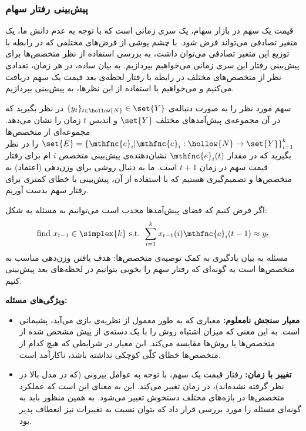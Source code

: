 \documentclass[a4paper,11px]{article}
\begin{document}
\subsubsection{
پیش‌بینی رفتار سهام
}


قیمت یک سهم در بازار سهام، یک سری زمانی است که با توجه به عدم دانش ما، یک متغیر تصادفی می‌تواند فرض شود. با چشم پوشی از فرض‌های مختلفی که در رابطه با توزیع این متغیر تصادفی می‌توان داشت، به بررسی استفاده از نظر متخصص‌ها برای پیش‌بینی رفتار این سری زمانی می‌خواهیم بپردازیم. به بیان ساده، در هر زمان، تعدادی نظر از متخصص‌های مختلف در رابطه با رفتار لحظه‌ی بعد قیمت یک سهم دریافت می‌کنیم و می‌خواهیم با استفاده از این نظرها، به پیش‌بینی بپردازیم.

سهم مورد نظر را به صورت دنباله‌ی
$\{ y_t \}_{t \in \hollow{N}} \in \set{Y}$
در نظر بگیرید که در آن مجموعه‌ی پیش‌آمدهای مختلف
$\set{Y}$
و اندیس
$t$
زمان را نشان می‌دهد. مجموعه‌ای از متخصص‌ها
$\set{E} = \left\lbrace \mthfnc{e}_i \vert \mthfnc{e}_i: \hollow{N} \rightarrow \set{Y} \right\rbrace^{k}_{i=1}$
را در نظر بگیرید که در مقدار
$\mthfnc{e}_i(t)$
نشان‌دهنده‌ی پیش‌بینی متخصص
$i$
ام برای رفتار قیمت سهم در زمان
$t+1$
است. ما به دنبال روشی برای وزن‌دهی (اعتماد) به متخصص‌ها و تصمیم‌گیری هستیم که با استفاده از آن، پیش‌بینی با خطای کمتری برای رفتار سهم بدست آوریم.

اگر فرض کنیم که فضای پیش‌آمدها محدب است می‌توانیم به مسئله به شکل:
\[
\mbox{find } x_{t-1} \in \simplex{k} \mbox{ s.t. } \sum^{k}_{i=1} x_{t-1}(i) \mthfnc{e}_i(t-1) \approx y_t
\]
مسئله به بیان یادگیری به کمک توصیه‌ی متخصص‌ها: هدف یافتن وزن‌دهی مناسب به متخصص‌ها است به گونه‌ای که رفتار سهم را بخوبی بتوانیم در لحظه‌های بعد پیش‌بینی کنیم.

\textbf{
ویژگی‌های مسئله:
}
\begin{itemize}
\item\textbf{
معیار سنجش نامعلوم:
}
معیاری که به طور معمول از نظریه‌ی بازی
می‌آید، پشیمانی
است. به این معنی که میزان اشتباه روش را با یک دسته‌ی از پیش مشخص شده از متخصص‌ها یا روش‌ها مقایسه می‌کند. ابن معیار در شرایطی که هیچ کدام از متخصص‌ها خطای کلّی کوچکی نداشته باشد، ناکارآمد است.
\item\textbf{
تغییر با زمان:
}
رفتار قیمت یک سهم، با توجه به عوامل بیرونی (که در مدل بالا در نظر گرفته نشده‌اند)، در زمان تغییر می‌کند. این به معنای این است که عملکرد متخصص‌ها در بازه‌های مختلف دستخوش تغییر می‌شود. به همین منظور باید به گونه‌ای مسئله را مورد بررسی قرار داد که بتوان نسبت به تغییرات نیز انعطاف پدیر بود.
\end{itemize}
\end{document}
